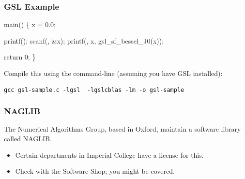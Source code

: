 \documentclass[smaller,handout,table]{beamer}
\begin{document}
\begin{frame}[fragile]
\frametitle{GSL Example}
\vspace{-0.2in}
\begin{semiverbatim}
\small
{} 
 

 main()
\{
    x = 0.0;

   printf();
   scanf(, \&x);
   printf(, x, gsl\_sf\_bessel\_J0(x));

   return 0;
\}
\end{semiverbatim}
Compile this using the command-line (assuming you have GSL installed):
\begin{verbatim}
gcc gsl-sample.c -lgsl  -lgslcblas -lm -o gsl-sample
\end{verbatim}
\end{frame}

\begin{frame}
\frametitle{NAGLIB}
The Numerical Algorithms Group, based in Oxford, maintain a software library called NAGLIB.
\begin{itemize}
\item Certain departments in Imperial College have a license for this.
\item Check with the Software Shop; you might be covered.
\end{itemize}
\end{frame}
\end{document}

